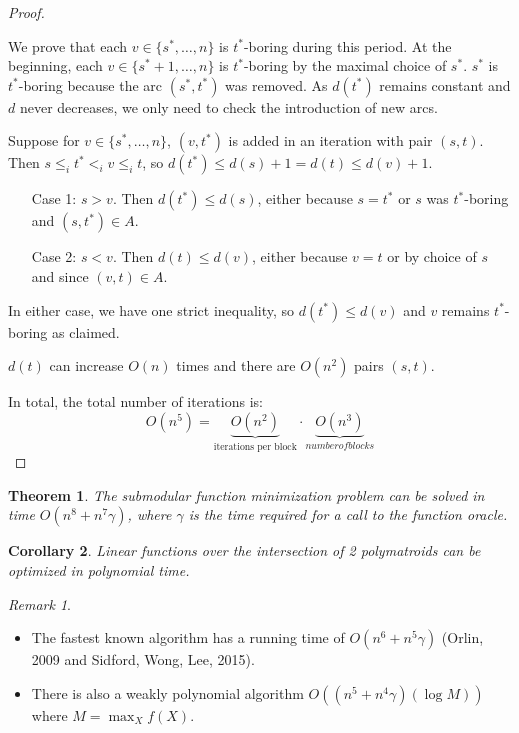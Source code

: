 \documentclass[11pt, a4paper]{article}
\newcommand{\set}[1]{\{#1\}}
\newtheorem{theorem}{Theorem}[section]
\newtheorem{cor}[theorem]{Corollary}
\theoremstyle{remark}
\newtheorem*{uremark}{Remark}
\theoremstyle{definition}
\begin{document}
\begin{proof}
\begin{itemize}
		We prove that each $v\in \set{s^*,\ldots,n}$ is $t^*$-boring during
		this period. At the beginning, each $v\in \set{s^* +1,\ldots,n}$ is
		$t^*$-boring by the maximal choice of $s^*$. $s^*$ is $t^*$-boring
		because the arc $(s^*,t^*)$ was removed. As $d(t^*)$ remains constant
		and $d$ never decreases, we only need to check the introduction of
		new arcs.

		Suppose for $v\in\set{s^*,\ldots,n}$, $(v,t^*)$ is added in an
		iteration with pair $(s,t)$. Then $s\leq_i t^*<_i v\leq_i t$, so
		$d(t^*)\leq d(s)+1=d(t)\leq d(v)+1$.
		\begin{enumerate}
			\item[Case 1:] $s>v$. Then $d(t^*)\leq d(s)$, either because $s=t^*$ or $s$
			was $t^*$-boring and $(s,t^*)\in A$.

			\item[Case 2:] $s<v$. Then $d(t)\leq d(v)$, either because $v=t$ or by
			choice of $s$ and since $(v,t)\in A$.
		\end{enumerate}
		In either case, we have one strict inequality, so $d(t^*)\leq d(v)$
		and $v$ remains $t^*$-boring as claimed.

		$d(t)$ can increase $O(n)$ times and there are $O(n^2)$ pairs $(s,t)$.
	\end{itemize}
	In total, the total number of iterations is:
	\[O(n^5)=\underbrace{O(n^2)}_{\text{iterations per block}}
		\cdot\underbrace{O(n^3)}_{number of blocks}\]
\end{proof}

\begin{theorem}
	The submodular function minimization problem can be solved in time
	$O(n^8+n^7\gamma)$, where $\gamma$ is the time required for a call to
	the function oracle.
\end{theorem}

\begin{cor}
	Linear functions over the intersection of 2 polymatroids can be optimized
	in polynomial time.
\end{cor}

\begin{uremark}\
	\begin{itemize}
		\item
		The fastest known algorithm has a running time of $O(n^6+n^5\gamma)$
		(Orlin, 2009 and Sidford, Wong, Lee, 2015).

		\item
		There is also a weakly polynomial algorithm $O((n^5+n^4\gamma)(\log M))$
		where $M=\max_{X}f(X)$.
	\end{itemize}
\end{uremark}
\end{document}
